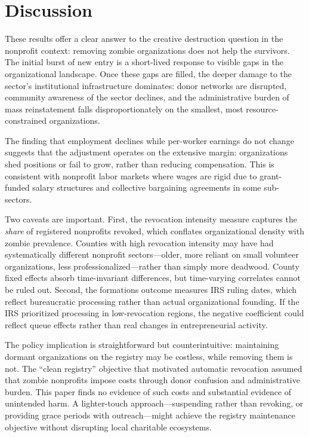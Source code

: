 \documentclass[12pt]{article}
\begin{document}


\section{Discussion}

These results offer a clear answer to the creative destruction question in the nonprofit context: removing zombie organizations does not help the survivors. The initial burst of new entry is a short-lived response to visible gaps in the organizational landscape. Once these gaps are filled, the deeper damage to the sector's institutional infrastructure dominates: donor networks are disrupted, community awareness of the sector declines, and the administrative burden of mass reinstatement falls disproportionately on the smallest, most resource-constrained organizations.

The finding that employment declines while per-worker earnings do not change suggests that the adjustment operates on the extensive margin: organizations shed positions or fail to grow, rather than reducing compensation. This is consistent with nonprofit labor markets where wages are rigid due to grant-funded salary structures and collective bargaining agreements in some sub-sectors.

Two caveats are important. First, the revocation intensity measure captures the \emph{share} of registered nonprofits revoked, which conflates organizational density with zombie prevalence. Counties with high revocation intensity may have had systematically different nonprofit sectors---older, more reliant on small volunteer organizations, less professionalized---rather than simply more deadwood. County fixed effects absorb time-invariant differences, but time-varying correlates cannot be ruled out. Second, the formations outcome measures IRS ruling dates, which reflect bureaucratic processing rather than actual organizational founding. If the IRS prioritized processing in low-revocation regions, the negative coefficient could reflect queue effects rather than real changes in entrepreneurial activity.

The policy implication is straightforward but counterintuitive: maintaining dormant organizations on the registry may be costless, while removing them is not. The ``clean registry'' objective that motivated automatic revocation assumed that zombie nonprofits impose costs through donor confusion and administrative burden. This paper finds no evidence of such costs and substantial evidence of unintended harm. A lighter-touch approach---suspending rather than revoking, or providing grace periods with outreach---might achieve the registry maintenance objective without disrupting local charitable ecosystems.
\end{document}
